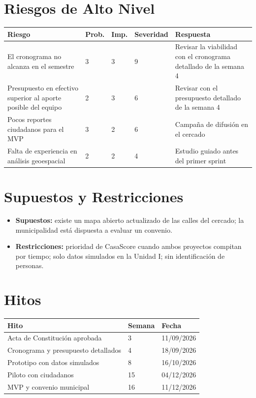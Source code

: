 \documentclass[11pt,a4paper]{article}
\begin{document}
\section{Riesgos de Alto Nivel}
{\small
\noindent\begin{tabularx}{\textwidth}{@{}L C{1.0cm} C{1.0cm} C{1.6cm} L@{}}
\toprule
{}
\textbf{Riesgo} & \textbf{Prob.} & \textbf{Imp.} & \textbf{Severidad} & \textbf{Respuesta} \\
\midrule
El cronograma no alcanza en el semestre & 3 & 3 & 9 & Revisar la viabilidad con el cronograma detallado de la semana 4 \\
Presupuesto en efectivo superior al aporte posible del equipo & 2 & 3 & 6 & Revisar con el presupuesto detallado de la semana 4 \\
Pocos reportes ciudadanos para el MVP & 3 & 2 & 6 & Campaña de difusión en el cercado \\
Falta de experiencia en análisis geoespacial & 2 & 2 & 4 & Estudio guiado antes del primer sprint \\
\bottomrule
\end{tabularx}
}

\section{Supuestos y Restricciones}
\begin{itemize}[leftmargin=*]
    \item \textbf{Supuestos:} existe un mapa abierto actualizado de las calles del cercado; la municipalidad está dispuesta a evaluar un convenio.
    \item \textbf{Restricciones:} prioridad de CasaScore cuando ambos proyectos compitan por tiempo; solo datos simulados en la Unidad I; sin identificación de personas.
\end{itemize}

\section{Hitos}
{\small
\noindent\begin{tabularx}{\textwidth}{@{}L C{1.4cm} P{2.6cm}@{}}
\toprule
{}
\textbf{Hito} & \textbf{Semana} & \textbf{Fecha} \\
\midrule
Acta de Constitución aprobada & 3 & 11/09/2026 \\
Cronograma y presupuesto detallados & 4 & 18/09/2026 \\
Prototipo con datos simulados & 8 & 16/10/2026 \\
Piloto con ciudadanos & 15 & 04/12/2026 \\
MVP y convenio municipal & 16 & 11/12/2026 \\
\bottomrule
\end{tabularx}
}
\end{document}
